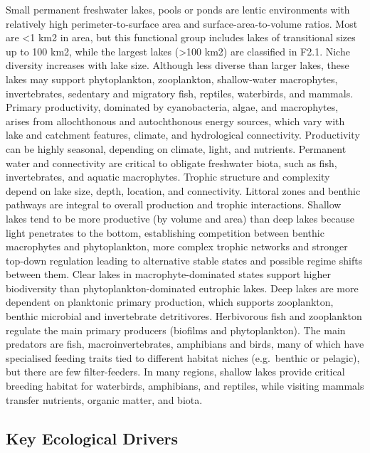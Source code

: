 \documentclass[
  letterpaper,
  DIV=11,
  numbers=noendperiod]{scrartcl}
\begin{document}
Small permanent freshwater lakes, pools or ponds are lentic environments
with relatively high perimeter-to-surface area and
surface-area-to-volume ratios. Most are \textless1 km2 in area, but this
functional group includes lakes of transitional sizes up to 100 km2,
while the largest lakes (\textgreater100 km2) are classified in F2.1.
Niche diversity increases with lake size. Although less diverse than
larger lakes, these lakes may support phytoplankton, zooplankton,
shallow-water macrophytes, invertebrates, sedentary and migratory fish,
reptiles, waterbirds, and mammals. Primary productivity, dominated by
cyanobacteria, algae, and macrophytes, arises from allochthonous and
autochthonous energy sources, which vary with lake and catchment
features, climate, and hydrological connectivity. Productivity can be
highly seasonal, depending on climate, light, and nutrients. Permanent
water and connectivity are critical to obligate freshwater biota, such
as fish, invertebrates, and aquatic macrophytes. Trophic structure and
complexity depend on lake size, depth, location, and connectivity.
Littoral zones and benthic pathways are integral to overall production
and trophic interactions. Shallow lakes tend to be more productive (by
volume and area) than deep lakes because light penetrates to the bottom,
establishing competition between benthic macrophytes and phytoplankton,
more complex trophic networks and stronger top-down regulation leading
to alternative stable states and possible regime shifts between them.
Clear lakes in macrophyte-dominated states support higher biodiversity
than phytoplankton-dominated eutrophic lakes. Deep lakes are more
dependent on planktonic primary production, which supports zooplankton,
benthic microbial and invertebrate detritivores. Herbivorous fish and
zooplankton regulate the main primary producers (biofilms and
phytoplankton). The main predators are fish, macroinvertebrates,
amphibians and birds, many of which have specialised feeding traits tied
to different habitat niches (e.g.~benthic or pelagic), but there are few
filter-feeders. In many regions, shallow lakes provide critical breeding
habitat for waterbirds, amphibians, and reptiles, while visiting mammals
transfer nutrients, organic matter, and biota.

\subsection{Key Ecological Drivers}\label{key-ecological-drivers-9}
\end{document}
